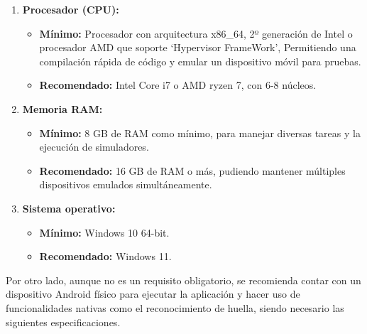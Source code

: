\begin{enumerate}

\item\textbf{Procesador (CPU):}
	\begin{itemize}
	\item\textbf{Mínimo:} Procesador con arquitectura x86\_64, 2º generación de Intel o procesador AMD que
	 soporte `Hypervisor FrameWork', Permitiendo una compilación rápida de código y emular un dispositivo 	
	 móvil para pruebas.
	\item\textbf{Recomendado:} Intel Core i7 o AMD ryzen 7, con 6-8 núcleos.
	\end{itemize}
	
\item\textbf{Memoria RAM:}
	\begin{itemize}
	\item\textbf{Mínimo:} 8 GB de RAM como mínimo, para manejar diversas tareas y la ejecución de
	simuladores.
	\item\textbf{Recomendado:} 16 GB de RAM o más, pudiendo mantener múltiples dispositivos emulados
	simultáneamente.
	\end{itemize}
	
\item\textbf{Sistema operativo:}
	\begin{itemize}
	\item\textbf{Mínimo:} Windows 10 64-bit.
	\item\textbf{Recomendado:} Windows 11.
	\end{itemize}

\end{enumerate}

Por otro lado, aunque no es un requisito obligatorio, se recomienda contar con un dispositivo Android físico para ejecutar la aplicación y hacer uso de funcionalidades nativas como el reconocimiento de huella, siendo necesario las siguientes especificaciones.

